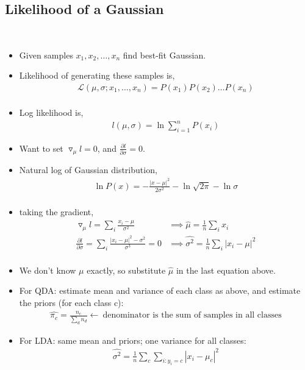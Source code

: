 \documentclass[10pt]{article}
\begin{document}
	\subsection*{Likelihood of a Gaussian}
		\
		\begin{itemize}
			\item Given samples $x_{1}, x_{2}, \dots, x_{n}$ find best-fit Gaussian.
			\item Likelihood of generating these samples is,
				\begin{align*}
					\mathcal{L}(\mu, \sigma;x_{1}, \dots, x_{n}) = P(x_{1})P(x_{2}) \dots P(x_{n})\\
				\end{align*}
			\item Log likelihood is,
				\begin{align*}
					l(\mu, \sigma) = \ln \sum_{i=1}^{n} P(x_{i})
				\end{align*}
			\item Want to set $\triangledown_{\mu} l = 0$, and  $\frac{\partial l}{\partial \sigma} = 0$.
			\item Natural log of Gaussian distribution,
				\begin{align*}
					\ln P(x) = -\frac{|x-\mu|^{2}}{2\sigma^{2}} - \ln \sqrt{2\pi} - \ln \sigma\\
				\end{align*}
			\item taking the gradient,
				\begin{align*}
					\triangledown_{\mu}l = \sum_{i} \frac{x_{i}-\mu}{\sigma^{2}} &\implies \hat{\mu} = \frac{1}{n} \sum_{i} x_{i}\\
					\frac{\partial l}{\partial \sigma} = \sum_{i} \frac{|x_{i} - \mu|^{2} - \sigma^{2}}{\sigma^{3}} = 0 &\implies \hat{\sigma^{2}} = \frac{1}{n} \sum_{i} |x_{i} - \mu|^{2}\\
				\end{align*}
			\item We don't know $\mu$ exactly, so substitute $\hat{\mu}$ in the last equation above.
			\item For QDA: estimate mean and variance of each class as above, and estimate the priors (for each class c):
				\begin{align*}
					\hat{\pi_{c}} = \frac{n_{c}}{\sum_{d} n_{d}} \leftarrow \ \text{denominator is the sum of samples in all classes}
				\end{align*}
			\item For LDA: same mean and priors; one variance for all classes:
				\begin{align*}
					\hat{\sigma^{2}} = \frac{1}{n} \sum_{c} \sum_{i:y_{i}=c} |x_{i} - \mu_{c}|^{2}
				\end{align*}
		\end{itemize}
\end{document}
